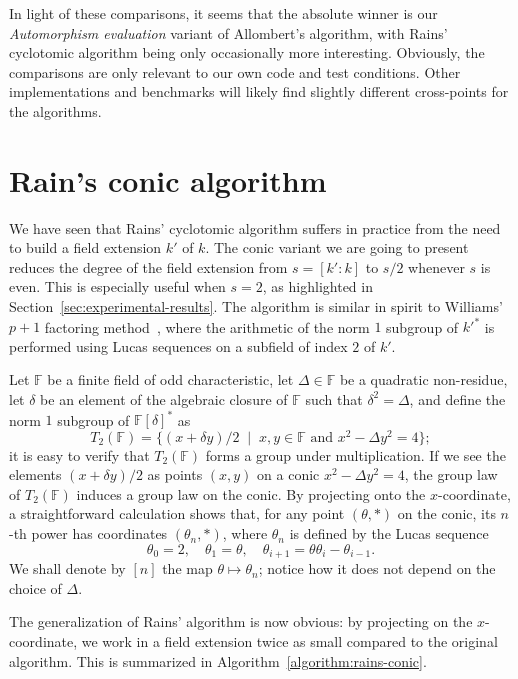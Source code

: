 \documentclass{mcom-l}
\theoremstyle{plain}
\theoremstyle{definition}
\newcommand{\F}{\ensuremath{\mathbb{F}}}
\newcounter{algorithm}
\begin{document}
In light of these comparisons, it seems that the absolute winner is
our \emph{Automorphism evaluation} variant of Allombert's algorithm,
with Rains' cyclotomic algorithm being only occasionally more
interesting. %
Obviously, the comparisons are only relevant to our own code and test
conditions. Other implementations and benchmarks will likely find
slightly different cross-points for the algorithms.


\appendix


\section{Rain's conic algorithm}
\label{app:rains-vars}

We have seen that Rains' cyclotomic algorithm suffers in practice from
the need to build a field extension $k'$ of $k$. %
The conic variant we are going to present reduces the degree of the
field extension from $s=[k':k]$ to $s/2$ whenever $s$ is even. %
This is especially useful when $s=2$, as highlighted in
Section~\ref{sec:experimental-results}. %
The algorithm is similar in spirit to Williams' $p+1$ factoring
method~\cite{williams1982}, where the arithmetic of the norm $1$
subgroup of ${k'}^*$ is performed using Lucas sequences on a subfield
of index $2$ of $k'$.

Let $\F$ be a finite field of odd characteristic, let $\Delta\in\F$ be
a quadratic non-residue, let $\delta$ be an element of the algebraic
closure of $\F$ such that $\delta^2=\Delta$, and define the norm $1$
subgroup of $\F[\delta]^*$ as
\[T_2(\F) = \{(x+\delta y)/2 \;\mid\; x,y\in\F \text{ and } x^2-\Delta
  y^2 = 4\};\] %
it is easy to verify that $T_2(\F)$ forms a group under
multiplication. %
If we see the elements $(x+\delta y)/2$ as points $(x,y)$ on a conic
$x^2-\Delta y^2=4$, the group law of $T_2(\F)$ induces a group law on
the conic. %
By projecting onto the $x$-coordinate, a straightforward calculation
shows that, for any point $(\theta,*)$ on the conic, its $n$-th power
has coordinates $(\theta_n,*)$, where $\theta_n$ is defined by the
Lucas sequence
\[\theta_0 = 2, \quad \theta_1 = \theta, \quad \theta_{i+1}=\theta\theta_i-\theta_{i-1}.\] %
We shall denote by $[n]$ the map $\theta\mapsto\theta_n$; notice how
it does not depend on the choice of $\Delta$.

The generalization of Rains' algorithm is now obvious: by projecting
on the $x$-coordinate, we work in a field extension twice as small
compared to the original algorithm. %
This is summarized in Algorithm~\ref{algorithm:rains-conic}.
\end{document}
